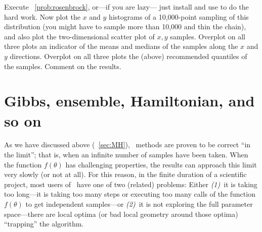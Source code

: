 \documentclass[12pt,twoside,pdftex]{article}
\newcommand{\MCMC}{\acronym{MCMC}}
\newcommand{\pars}{\theta}
\begin{document}
\begin{problem}
Execute \problemname~\ref{prob:rosenbrock}, or---if you are lazy---%
just install and use  to do the hard work.
Now plot the $x$ and $y$ histograms of a 10,000-point sampling of this
distribution (you might have to sample more than 10,000 and thin the
chain), and also plot the two-dimensional scatter plot of $x,y$
samples.
Overplot on all three plots an indicator of the means and medians of
the samples along the $x$ and $y$ directions.
Overplot on all three plots the (above) recommended quantiles of the
samples.
Comment on the results.
\end{problem}

\section{Gibbs, ensemble, Hamiltonian, and so on}\label{sec:methods}

As we have discussed above (\sectionname~\ref{sec:MH}),
\MCMC\ methods are proven to be correct ``in the limit''; that is, when
an infinite number of samples have been taken.
When the function $f(\pars)$ has challenging properties, the results
can approach this limit very slowly (or not at all).
For this reason, in the finite duration of a scientific project, most
users of \MCMC\ have one of two (related) problems:
Either \textsl{(1)}~it is taking too long---it is taking too many steps or
executing too many calls of the function $f(\pars)$ to get independent
samples---or \textsl{(2)}~it is not
exploring the full parameter space---there are local optima (or bad
local geometry around those optima) ``trapping'' the algorithm.
\end{document}
